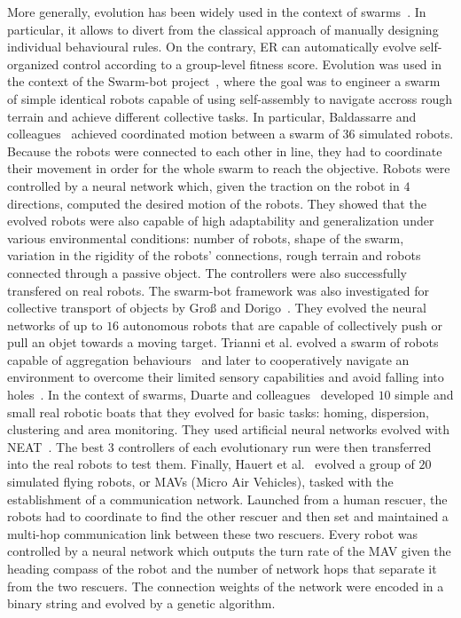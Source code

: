    More generally, evolution has been widely used in the context of swarms~\parencite{Brambilla2012, Francesca2016}. In particular, it allows to divert from the classical approach of manually designing individual behavioural rules. On the contrary, ER can automatically evolve self-organized control according to a group-level fitness score. Evolution was used in the context of the Swarm-bot project~\parencite{Mondada2005}, where the goal was to engineer a swarm of simple identical robots capable of using self-assembly to navigate accross rough terrain and achieve different collective tasks. In particular, Baldassarre and colleagues~\parencite{Baldassarre2003b, Baldassarre2007} achieved coordinated motion between a swarm of $36$ simulated robots. Because the robots were connected to each other in line, they had to coordinate their movement in order for the whole swarm to reach the objective. Robots were controlled by a neural network which, given the traction on the robot in $4$ directions, computed the desired motion of the robots. They showed that the evolved robots were also capable of high adaptability and generalization under various environmental conditions: number of robots, shape of the swarm, variation in the rigidity of the robots' connections, rough terrain and robots connected through a passive object. The controllers were also successfully transfered on real robots. The swarm-bot framework was also investigated for collective transport of objects by Groß and Dorigo~\parencite{Gross2004a}. They evolved the neural networks of up to $16$ autonomous robots that are capable of collectively push or pull an objet towards a moving target. Trianni et al. evolved a swarm of robots capable of aggregation behaviours~\parencite{Trianni2003} and later to cooperatively navigate an environment to overcome their limited sensory capabilities and avoid falling into holes~\parencite{Trianni2004}. In the context of swarms, Duarte and colleagues~\parencite{Duarte2016} developed $10$ simple and small real robotic boats that they evolved for basic tasks: homing, dispersion, clustering and area monitoring. They used artificial neural networks evolved with NEAT~\parencite{Stanley2002}. The best $3$ controllers of each evolutionary run were then transferred into the real robots to test them. Finally, Hauert et al.~\parencite{Hauert2009} evolved a group of $20$ simulated flying robots, or MAVs (Micro Air Vehicles), tasked with the establishment of a communication network. Launched from a human rescuer, the robots had to coordinate to find the other rescuer and then set and maintained a multi-hop communication link between these two rescuers. Every robot was controlled by a neural network which outputs the turn rate of the MAV given the heading compass of the robot and the number of network hops that separate it from the two rescuers. The connection weights of the network were encoded in a binary string and evolved by a genetic algorithm.

